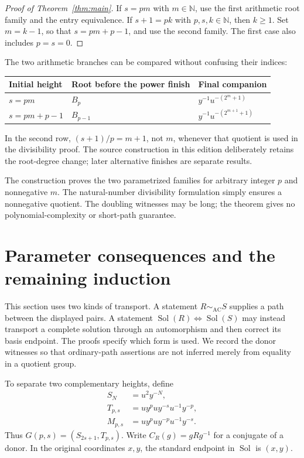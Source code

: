 \documentclass[11pt]{article}
\theoremstyle{definition}\newtheorem{definition}[theorem]{Definition}
\theoremstyle{remark}\newtheorem{remark}[theorem]{Remark}
\newcommand{\Sol}{\operatorname{Sol}}
\newcommand{\AC}{\mathrel{\sim_{\mathrm{AC}}}}
\begin{document}
\begin{proof}[Proof of Theorem~\ref{thm:main}]
If $s=pm$ with $m\in\mathbb N$, use the first arithmetic root family and the entry equivalence. If $s+1=pk$ with $p,s,k\in\mathbb N$, then $k\ge1$. Set $m=k-1$, so that $s=pm+p-1$, and use the second family. The first case also includes $p=s=0$.
\end{proof}
The two arithmetic branches can be compared without confusing their indices:
\begin{center}
\begin{tabular}{@{}lll@{}}
\toprule
Initial height & Root before the power finish & Final companion\\
\midrule
$s=pm$ & $B_p$ & $y^{-1}u^{-(2^m+1)}$\\
$s=pm+p-1$ & $B_{p-1}$ & $y^{-1}u^{-(2^{m+1}+1)}$\\
\bottomrule
\end{tabular}
\end{center}
In the second row, $(s+1)/p=m+1$, not $m$, whenever that quotient is used in the divisibility proof. The source construction in this edition deliberately retains the root-degree change; later alternative finishes are separate results.

The construction proves the two parametrized families for arbitrary integer $p$ and nonnegative $m$. The natural-number divisibility formulation simply ensures a nonnegative quotient. The doubling witnesses may be long; the theorem gives no polynomial-complexity or short-path guarantee.

\section{Parameter consequences and the remaining induction}
This section uses two kinds of transport. A statement $R\AC S$ supplies a path between the displayed pairs. A statement $\Sol(R)\iff\Sol(S)$ may instead transport a complete solution through an automorphism and then correct its basis endpoint. The proofs specify which form is used. We record the donor witnesses so that ordinary-path assertions are not inferred merely from equality in a quotient group.

To separate two complementary heights, define
\[
\begin{aligned}
S_N&=u^2y^{-N},\\
T_{p,s}&=uy^puy^{-s}u^{-1}y^{-p},\\
M_{p,s}&=uy^puy^{-p}u^{-1}y^{-s}.
\end{aligned}
\]
Thus $G(p,s)=(S_{2s+1},T_{p,s})$. Write $C_R(g)=gRg^{-1}$ for a conjugate of a donor. In the original coordinates $x,y$, the standard endpoint in $\Sol$ is $(x,y)$.
\end{document}
